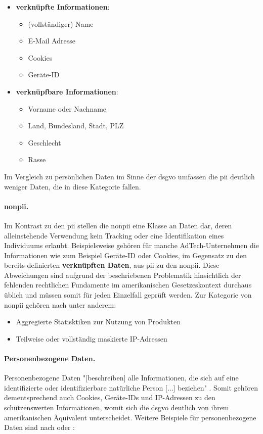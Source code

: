\begin{itemize}
	\item \textbf{verknüpfte Informationen}:
		\begin{itemize}
			\item (vollständiger) Name
			\item E-Mail Adresse
			\item Cookies
			\item Geräte-ID
		\end{itemize}
	\item \textbf{verknüpfbare Informationen}:
		\begin{itemize}
			\item Vorname oder Nachname
			\item Land, Bundesland, Stadt, PLZ
			\item Geschlecht
			\item Rasse
		\end{itemize}
\end{itemize}

\noindent Im Vergleich zu persönlichen Daten im Sinne der \ac{dsgvo} umfassen die \acs{pii} deutlich weniger Daten, die in diese Kategorie fallen.

\paragraph{\acf{nonpii}.}
\label{sec:Grundlagen:para:Non Personal Identifiable Information}
Im Kontrast zu den \ac{pii} stellen die \ac{nonpii} eine Klasse an Daten dar, deren alleinstehende Verwendung kein Tracking oder eine Identifikation eines Individuums erlaubt. Beispielsweise gehören für manche AdTech-Unternehmen die Informationen wie zum Beispiel Geräte-ID oder Cookies, im Gegensatz zu den bereits definierten \textbf{verknüpften Daten}, aus \ac{pii} zu den \ac{nonpii}. Diese Abweichungen sind aufgrund der beschriebenen Problematik hinsichtlich der fehlenden rechtlichen Fundamente im amerikanischen Gesetzeskontext durchaus üblich und müssen somit für jeden Einzelfall geprüft werden. Zur Kategorie von \ac{nonpii} gehören nach \cite{PiwikPro2022} unter anderem:

\begin{itemize}
	\item Aggregierte Statisktiken zur Nutzung von Produkten
	\item Teilweise oder vollständig maskierte IP-Adressen
\end{itemize} 

\paragraph{Personenbezogene Daten.}
\label{sec:Grundlagen:para:Personenbezogene Daten}
Personenbezogene Daten "[beschreiben] alle Informationen, die sich auf eine identifizierte oder identifizierbare natürliche Person [...] beziehen" \cite{DSGVOArt4}. Somit gehören dementsprechend auch Cookies, Geräte-IDs und IP-Adressen zu den schützenswerten Informationen, womit sich die \ac{dsgvo} deutlich von ihrem amerikanischen Äquivalent unterscheidet. Weitere Beispiele für personenbezogene Daten sind nach \cite{PiwikPro2022} oder \cite{DSGVOPerDa}:

